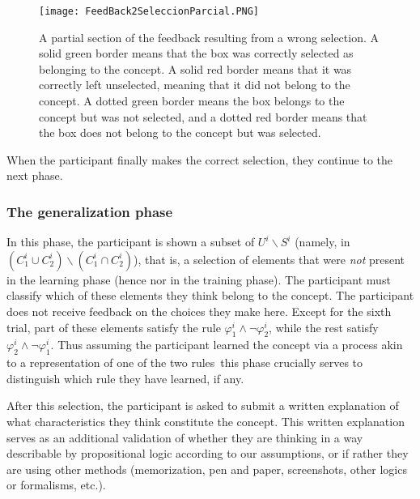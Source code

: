 \begin{figure}[h!] 
\begin{center}
    	\texttt{[image: FeedBack2SeleccionParcial.PNG]}
	\caption{A partial section of the feedback resulting from a wrong selection. A solid green border means that the box was correctly selected as belonging to the concept. A solid red border means that it was correctly left unselected, meaning that it did not belong to the concept. A dotted green border means the box belongs to the concept but was not selected, and a dotted red border means that the box does not belong to the concept but was selected.}
	\label{Figure:Misclassifications}
\end{center}
\end{figure}

When the participant finally makes the correct selection, they continue to the next phase. 

\subsubsection{The generalization phase}\label{Subsection:generalization}

In this phase, the participant is shown a subset of $U^i \backslash S^i$ (namely, in $(C^i_1 \cup C^i_2) \backslash (C^i_1 \cap C^i_2)$), that is, a selection of elements that were \emph{not} present in the learning phase (hence nor in the training phase). The participant must classify which of these elements they think belong to the concept. The participant does not receive feedback on the choices they make here. Except for the sixth trial, part of these elements satisfy the rule $\varphi^i_1 \land \lnot \varphi^i_2$, while the rest satisfy $\varphi^i_2 \land \lnot \varphi^i_1$. %
Thus \textemdash assuming the participant learned the concept via a process akin to a representation of one of the two rules\textemdash\, this phase crucially serves to distinguish which rule they have learned, if any.

After this selection, the participant is asked to submit a written explanation of what characteristics they think constitute the concept. This written explanation serves as an additional validation of whether they are thinking in a way describable by propositional logic according to our assumptions, or if rather they are using other methods (memorization, pen and paper, screenshots, other logics or formalisms, etc.). 

